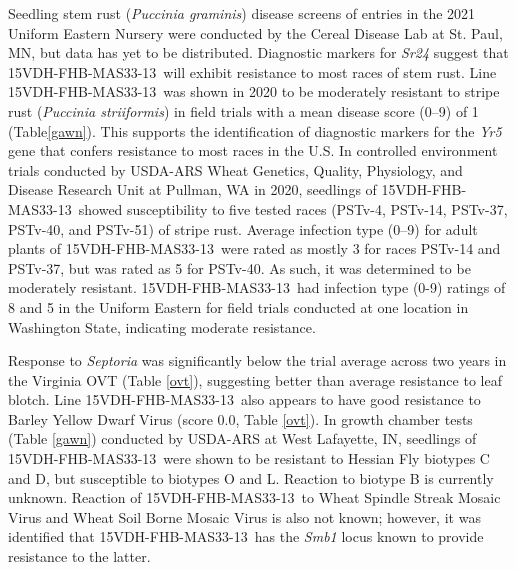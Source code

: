 \documentclass[12pt, letterpaper]{article}
\newcommand{\lin}{15VDH-FHB-MAS33-13~}
\begin{document}
Seedling stem rust (\textit{Puccinia graminis}) disease screens of entries in the 2021 Uniform Eastern Nursery were conducted by the Cereal Disease Lab at St. Paul, MN, but data has yet to be distributed. Diagnostic markers for \textit{Sr24} suggest that \lin will exhibit resistance to most races of stem rust. Line \lin was shown in 2020 to be moderately resistant to stripe rust (\textit{Puccinia striiformis}) in field trials with a mean disease score (0--9) of 1 (Table\ref{gawn}). This supports the identification of diagnostic markers for the \textit{Yr5} gene that confers resistance to most races in the U.S. In controlled environment trials conducted by USDA-ARS Wheat Genetics, Quality, Physiology, and Disease Research Unit at Pullman, WA in 2020, seedlings of \lin showed susceptibility to five tested races (PSTv-4, PSTv-14, PSTv-37, PSTv-40, and PSTv-51) of stripe rust. Average infection type (0--9) for adult plants of \lin were rated as mostly 3 for races PSTv-14 and PSTv-37, but was rated as 5 for PSTv-40. As such, it was determined to be moderately resistant. \lin had infection type (0-9) ratings of 8 and 5 in the Uniform Eastern for field trials conducted at one location in Washington State, indicating moderate resistance. 

Response to \textit{Septoria} was significantly below the trial average across two years in the Virginia OVT (Table \ref{ovt}), suggesting better than average resistance to leaf blotch. Line \lin also appears to have good resistance to Barley Yellow Dwarf Virus (score 0.0, Table \ref{ovt}). In growth chamber tests (Table \ref{gawn}) conducted by USDA-ARS at West Lafayette, IN, seedlings of \lin were shown to be resistant to Hessian Fly biotypes C and D, but susceptible to biotypes O and L. Reaction to biotype B is currently unknown. Reaction of \lin to Wheat Spindle Streak Mosaic Virus and Wheat Soil Borne Mosaic Virus is also not known; however, it was identified that \lin has the \textit{Smb1} locus known to provide resistance to the latter. 
\end{document}
